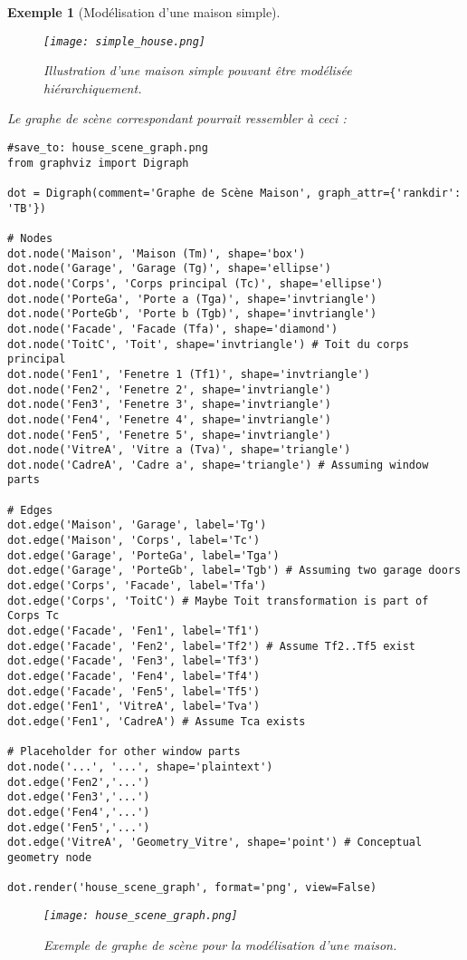 \documentclass{article}
\newtheorem{example}{Exemple}
\begin{document}
\begin{example}[Modélisation d'une maison simple]
\begin{figure}[H]
\centering
\texttt{[image: simple\_house.png]}
\caption{Illustration d'une maison simple pouvant être modélisée hiérarchiquement.}
\label{fig:simple_house}
\end{figure}

Le graphe de scène correspondant pourrait ressembler à ceci :

\begin{verbatim}
#save_to: house_scene_graph.png
from graphviz import Digraph

dot = Digraph(comment='Graphe de Scène Maison', graph_attr={'rankdir': 'TB'})

# Nodes
dot.node('Maison', 'Maison (Tm)', shape='box')
dot.node('Garage', 'Garage (Tg)', shape='ellipse')
dot.node('Corps', 'Corps principal (Tc)', shape='ellipse')
dot.node('PorteGa', 'Porte a (Tga)', shape='invtriangle')
dot.node('PorteGb', 'Porte b (Tgb)', shape='invtriangle')
dot.node('Facade', 'Facade (Tfa)', shape='diamond')
dot.node('ToitC', 'Toit', shape='invtriangle') # Toit du corps principal
dot.node('Fen1', 'Fenetre 1 (Tf1)', shape='invtriangle')
dot.node('Fen2', 'Fenetre 2', shape='invtriangle')
dot.node('Fen3', 'Fenetre 3', shape='invtriangle')
dot.node('Fen4', 'Fenetre 4', shape='invtriangle')
dot.node('Fen5', 'Fenetre 5', shape='invtriangle')
dot.node('VitreA', 'Vitre a (Tva)', shape='triangle')
dot.node('CadreA', 'Cadre a', shape='triangle') # Assuming window parts

# Edges
dot.edge('Maison', 'Garage', label='Tg')
dot.edge('Maison', 'Corps', label='Tc')
dot.edge('Garage', 'PorteGa', label='Tga')
dot.edge('Garage', 'PorteGb', label='Tgb') # Assuming two garage doors
dot.edge('Corps', 'Facade', label='Tfa')
dot.edge('Corps', 'ToitC') # Maybe Toit transformation is part of Corps Tc
dot.edge('Facade', 'Fen1', label='Tf1')
dot.edge('Facade', 'Fen2', label='Tf2') # Assume Tf2..Tf5 exist
dot.edge('Facade', 'Fen3', label='Tf3')
dot.edge('Facade', 'Fen4', label='Tf4')
dot.edge('Facade', 'Fen5', label='Tf5')
dot.edge('Fen1', 'VitreA', label='Tva')
dot.edge('Fen1', 'CadreA') # Assume Tca exists

# Placeholder for other window parts
dot.node('...', '...', shape='plaintext')
dot.edge('Fen2','...')
dot.edge('Fen3','...')
dot.edge('Fen4','...')
dot.edge('Fen5','...')
dot.edge('VitreA', 'Geometry_Vitre', shape='point') # Conceptual geometry node

dot.render('house_scene_graph', format='png', view=False)
\end{verbatim}

\begin{figure}[H]
\centering
\texttt{[image: house\_scene\_graph.png]}
\caption{Exemple de graphe de scène pour la modélisation d'une maison.}
\label{fig:house_scene_graph}
\end{figure}
\end{example}
\end{document}
